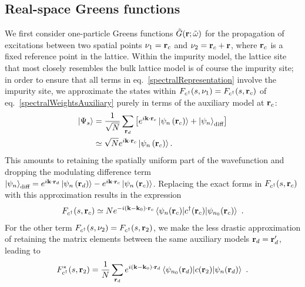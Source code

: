 \documentclass[reprint,hidelinks]{revtex4-2}
\begin{document}
\subsection{Real-space Greens functions}
We first consider one-particle Greens functions \(\tilde G({\bf r}; \tilde\omega)\) for the propagation of excitations between two spatial points \(\nu_1={\bf r}_c\) and \(\nu_2={\bf r}_c + {\bf r}\), where \({\bf r}_c\) is a fixed reference point in the lattice. Within the impurity model, the lattice site that most closely resembles the bulk lattice model is of course the impurity site; in order to ensure that all terms in eq.~\ref{spectralRepresentation} involve the impurity site, we approximate the states within \(F_{c^\dagger}(s,\nu_1) = F_{c^\dagger}(s,{\bf r}_c)\) of eq.~\ref{spectralWeightsAuxiliary} purely in terms of the auxiliary model at \({\bf r}_c\):
\begin{equation}\begin{aligned}\label{eigenstateUniform}
	\ket{\Psi_s} &= \frac{1}{\sqrt N}\sum_{{\bf r}_d} \left[e^{i {\bf k}\cdot{\bf r}_c} \ket{\psi_{n}\left({\bf r}_c\right)} + \ket{\psi_{n}}_\text{diff}\right]\\
		     &\simeq \sqrt N e^{i {\bf k}\cdot{\bf r}_c} \ket{\psi_{n}\left({\bf r}_c\right)}.
\end{aligned}\end{equation}
This amounts to retaining the spatially uniform part of the wavefunction and dropping the modulating difference term \(\ket{\psi_{n}}_\text{diff} = e^{i {\bf k}\cdot{\bf r}_d} \ket{\psi_{n}\left({\bf r}_d\right)} - e^{i {\bf k}\cdot{\bf r}_c} \ket{\psi_{n}\left({\bf r}_c\right)}\). Replacing the exact forms in \(F_{c^\dagger}(s, {\bf r}_c)\) with this approximation results in the expression
\begin{equation}\begin{aligned}
	F_{c^\dagger}(s, {\bf r}_c) \simeq N e^{-i \left({\bf k} - {\bf k}_0\right)\cdot{\bf r}_c} \braket{\psi_n({\bf r}_c)|c^\dagger({\bf r}_c)|\psi_{n_0}({\bf r}_c)}~.
\end{aligned}\end{equation}
For the other term \(F_{c^\dagger}(s,\nu_2) = F_{c^\dagger}(s,{\bf r}_2)\), we make the less drastic approximation of retaining the matrix elements between the same auxiliary models \({\bf r}_d = {\bf r}_d^\prime\), leading to
\begin{equation}\begin{aligned}
	F_{c^\dagger}^*(s, {\bf r}_2) = \frac{1}{N}\sum_{{\bf r}_d} e^{i \left({\bf k}- {\bf k}_0\right)\cdot{\bf r}_d} \braket{\psi_{n_0}({\bf r}_d)|c({\bf r}_2)|\psi_{n}({\bf r}_d)}~.
\end{aligned}\end{equation}
\end{document}
